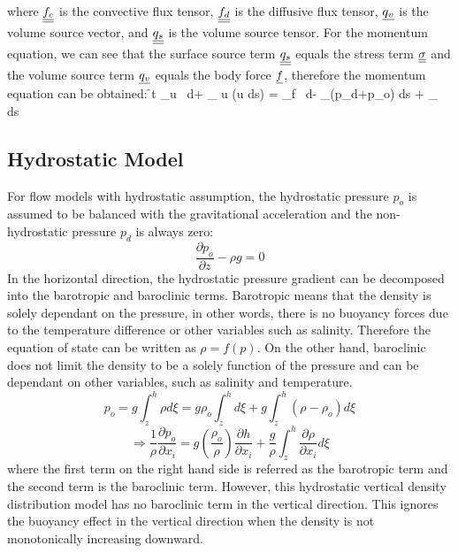 where $\underline{\underline{f_c}}$ is the convective flux tensor, $\underline{\underline{f_d}}$ is the diffusive flux tensor, $\underline{q_v}$ is the volume source vector, and $\underline{\underline{q_s}}$ is the volume source tensor. For the momentum equation, we can see that the surface source term $\underline{\underline{q_s}}$ equals the stress term $\underline{\underline\sigma}$ and the volume source term $\underline{q_v}$ equals the body force $\underline f$, therefore the momentum equation can be obtained:
\be
\f{\p}{\p t} \int_\Omega \rho \+u \ d\Omega+ \oint_{\p \Omega} \rho \+u (\+u \cd d\+s) = \int_\Omega \rho \+f \ d\Omega - \oint_{\p \Omega}(p_d+p_o) \cd d\+s + \oint_{\p \Omega} \+{\+\tau} \cd d\+s
\ee



\normalsize
\subsection*{Hydrostatic Model}
For flow models with hydrostatic assumption, the hydrostatic pressure $p_o$ is assumed to be balanced with the gravitational acceleration and the non-hydrostatic pressure $p_d$ is always zero:
\begin{equation}
 \frac{\partial p_o}{\partial z}- \rho g= 0
\end{equation}
In the horizontal direction, the hydrostatic pressure
gradient can be decomposed into the barotropic and baroclinic terms. Barotropic means that the density is solely dependant on the pressure, in other words, there is no buoyancy forces due to the temperature difference or other variables such as salinity. Therefore the equation of state can be written as $\rho=f(p)$. On the other hand, baroclinic does not limit the density to be a solely function of the pressure and can be dependant on other variables, such as salinity and temperature. %
\begin{equation}
p_o=g \int_z^h \rho d \xi = g \rho_o \int_z^h  d \xi + g \int_z^h
(\rho-\rho_o) d \xi
\end{equation}
\begin{equation}
\Rightarrow \frac{1}{\rho}\frac{\partial p_o}{\partial x_i}
=g(\frac{\rho_o}{\rho})\frac{\partial h}{\partial x_i} +
\frac{g}{\rho}\int_z^h \frac{\partial \rho}{\partial x_i} d \xi
\end{equation}
where the first term on the right hand side is referred as the barotropic term and the second term is the baroclinic term. However, this hydrostatic vertical density distribution model has no baroclinic term in the vertical direction. This ignores the buoyancy effect in the vertical direction when the density is not monotonically increasing downward.

